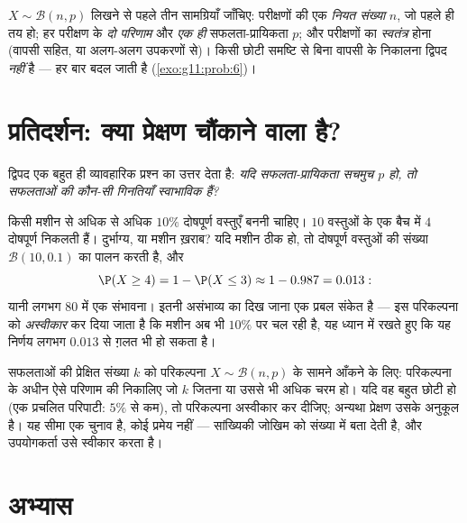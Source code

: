 \begin{method}[द्विपद स्थिति पहचानना]\label{met:g11:binom:recognize}
$X \sim \mathcal B(n, p)$ लिखने से पहले तीन सामग्रियाँ जाँचिए: परीक्षणों की एक \emph{नियत संख्या}
$n$, जो पहले ही तय हो; हर परीक्षण के \emph{दो परिणाम} और \emph{एक ही}
सफलता-प्रायिकता $p$; और परीक्षणों का \emph{स्वतंत्र} होना (वापसी सहित, या
अलग-अलग उपकरणों से)। किसी छोटी समष्टि से बिना वापसी के निकालना द्विपद
\emph{नहीं} है --- हर बार  बदल जाती है (\cref{exo:g11:prob:6})।
\end{method}

\section{प्रतिदर्शन: क्या प्रेक्षण चौंकाने वाला है?}

द्विपद  एक बहुत ही व्यावहारिक प्रश्न का उत्तर देता है: \emph{यदि
सफलता-प्रायिकता सचमुच $p$ हो, तो सफलताओं की कौन-सी गिनतियाँ स्वाभाविक
हैं?}

\begin{example}\label{ex:g11:binom:decision}
किसी मशीन से अधिक से अधिक $10\%$ दोषपूर्ण वस्तुएँ बननी चाहिए। $10$ वस्तुओं
के एक बैच में $4$ दोषपूर्ण निकलती हैं। दुर्भाग्य, या मशीन ख़राब? यदि मशीन
ठीक हो, तो दोषपूर्ण वस्तुओं की संख्या $\mathcal B(10, 0.1)$ का पालन करती है, और
\[
\P(X \geq 4) = 1 - \P(X \leq 3) \approx 1 - 0.987 = 0.013 :
\]
यानी लगभग $80$ में एक संभावना। इतनी असंभाव्य  का दिख जाना एक प्रबल
संकेत है --- इस परिकल्पना को \emph{अस्वीकार} कर दिया जाता है कि मशीन अब भी
$10\%$ पर चल रही है, यह ध्यान में रखते हुए कि यह निर्णय लगभग $0.013$ 
से ग़लत भी हो सकता है।
\end{example}

\begin{method}[द्विपद प्रतिरूप से निर्णय का नियम]\label{met:g11:binom:decision}
सफलताओं की प्रेक्षित संख्या $k$ को परिकल्पना $X \sim \mathcal B(n, p)$ के सामने आँकने के लिए:
परिकल्पना के अधीन ऐसे परिणाम की  निकालिए जो $k$ जितना या उससे भी
अधिक चरम हो। यदि वह  बहुत छोटी हो (एक प्रचलित परिपाटी: $5\%$ से कम),
तो परिकल्पना अस्वीकार कर दीजिए; अन्यथा प्रेक्षण उसके अनुकूल है। यह सीमा एक
चुनाव है, कोई प्रमेय नहीं --- सांख्यिकी जोखिम को संख्या में बता देती है, और
उपयोगकर्ता उसे स्वीकार करता है।
\end{method}

\section{अभ्यास}

